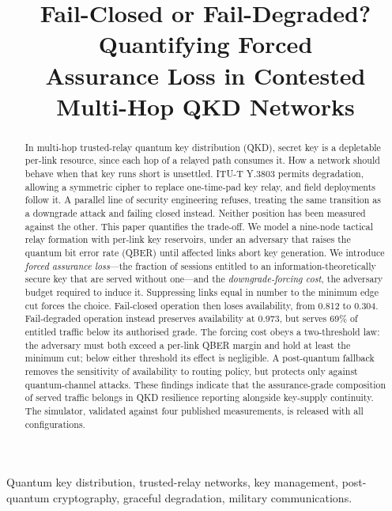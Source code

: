 \documentclass[conference]{IEEEtran}
\begin{document}
\title{Fail-Closed or Fail-Degraded? Quantifying Forced\\ Assurance Loss in
Contested Multi-Hop QKD Networks}

\author{\IEEEauthorblockN{[[Author]]}
\IEEEauthorblockA{[[Affiliation]]\\ [[email]]}}

\maketitle

\begin{abstract}
In multi-hop trusted-relay quantum key distribution (QKD), secret key is a
depletable per-link resource, since each hop of a relayed path consumes it. How a
network should behave when that key runs short is unsettled. ITU-T Y.3803 permits
degradation, allowing a symmetric cipher to replace one-time-pad key relay, and
field deployments follow it. A parallel line of security engineering refuses,
treating the same transition as a downgrade attack and failing closed instead.
Neither position has been measured against the other. This paper quantifies the
trade-off. We model a nine-node tactical relay formation with per-link key
reservoirs, under an adversary that raises the quantum bit error rate (QBER) until
affected links abort key generation. We introduce \emph{forced assurance
loss}---the fraction of sessions entitled to an information-theoretically secure
key that are served without one---and the \emph{downgrade-forcing cost}, the
adversary budget required to induce it. Suppressing links equal in number to the
minimum edge cut forces the choice. Fail-closed operation then loses availability,
from 0.812 to 0.304. Fail-degraded operation instead preserves availability at
0.973, but serves 69\% of entitled traffic below its authorised grade. The forcing
cost obeys a two-threshold law: the adversary must both exceed a per-link QBER
margin and hold at least the minimum cut; below either threshold its effect is
negligible. A post-quantum fallback removes the sensitivity of availability to
routing policy, but protects only against quantum-channel attacks. These findings
indicate that the assurance-grade composition of served traffic belongs in QKD
resilience reporting alongside key-supply continuity. The simulator, validated
against four published measurements, is released with all configurations.
\end{abstract}

\begin{IEEEkeywords}
Quantum key distribution, trusted-relay networks, key management, post-quantum
cryptography, graceful degradation, military communications.
\end{IEEEkeywords}
\end{document}
